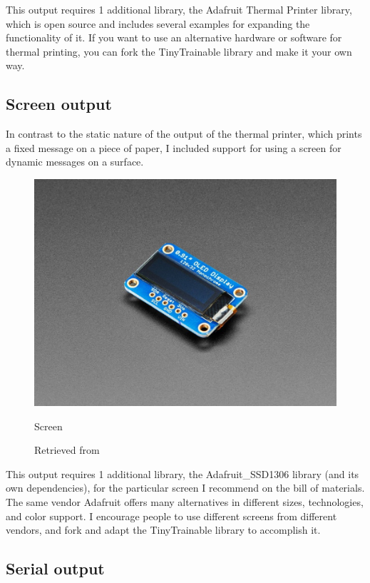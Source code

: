 This output requires 1 additional library, the Adafruit Thermal Printer library, which is open source and includes several examples for expanding the functionality of it. If you want to use an alternative hardware or software for thermal printing, you can fork the TinyTrainable library and make it your own way.

\subsection{Screen output}

In contrast to the static nature of the output of the thermal printer, which prints a fixed message on a piece of paper, I included support for using a screen for dynamic messages on a surface. 

\begin{figure}[ht]
  \centering
  \includegraphics[width=0.75\linewidth,height=0.25\textheight,keepaspectratio]{images/materials-adafruit-screen.jpg}
  \caption{Screen}
  \caption*{Retrieved from \cite{website-materials-adafruit-screen}}
  \label{fig:materials-adafruit-screen}
\end{figure}

This output requires 1 additional library, the Adafruit{\_}SSD1306 library (and its own dependencies), for the particular screen I recommend on the bill of materials. The same vendor Adafruit offers many alternatives in different sizes, technologies, and color support. I encourage people to use different screens from different vendors, and fork and adapt the TinyTrainable library to accomplish it.

\subsection{Serial output}

